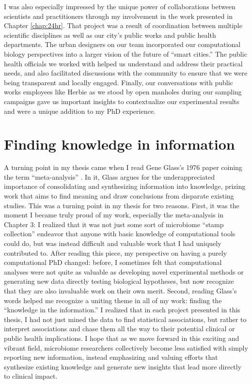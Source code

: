 I was also especially impressed by the unique power of collaborations between scientists and practitioners through my involvement in the work presented in Chapter \ref{chap:24hr}.
That project was a result of coordination between multiple scientific disciplines as well as our city's public works and public health departments.
The urban designers on our team incorporated our computational biology perspectives into a larger vision of the future of ``smart cities.''
The public health officials we worked with helped us understand and address their practical needs, and also facilitated discussions with the community to ensure that we were being transparent and locally engaged.
Finally, our conversations with public works employees like Herbie as we stood by open manholes during our sampling campaigns gave us important insights to contextualize our experimental results and were a unique addition to my PhD experience.

\section{Finding knowledge in information}

A turning point in my thesis came when I read Gene Glass's 1976 paper coining the term ``meta-analysis'' \cite{glass-1976}.
In it, Glass argues for the underappreciated importance of consolidating and synthesizing information into knowledge, prizing work that aims to find meaning and draw conclusions from disparate existing studies.
This was a turning point in my thesis for two reasons.
First, it was the moment I became truly proud of my work, especially the meta-analysis in Chapter 3: I realized that it was not just some sort of microbiome ``stamp collection'' endeavor that anyone with basic knowledge of computational tools could do, but was instead difficult and valuable work that I had uniquely contributed to.
After reading this piece, my perspective on having a purely computational PhD changed: before, I sometimes felt that computational analyses were not quite as valuable as developing novel experimental methods or generating new data directly testing biological hypotheses, but now recognize that they are also invaluable work on their own merit.
Second, reading Glass's words helped me recognize a uniting theme in all of my work: finding the ``knowledge in the information.''
I realized that in each project presented in this thesis, I had not just mined the data to find statistical associations, but rather to interpret associations and chase them all the way to their potential clinical or public health implications.
I hope that as we move forward in this exciting and vibrant field, microbiome researchers collectively become less satisfied with simply reporting new information, instead emphasizing and valuing efforts that synthesize existing knowledge and generate new insights that lead more directly to clinical impact.

\begin{singlespace}


\end{singlespace}
